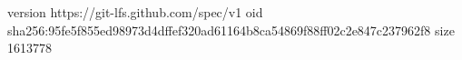 version https://git-lfs.github.com/spec/v1
oid sha256:95fe5f855ed98973d4dffef320ad61164b8ca54869f88ff02c2e847c237962f8
size 1613778
